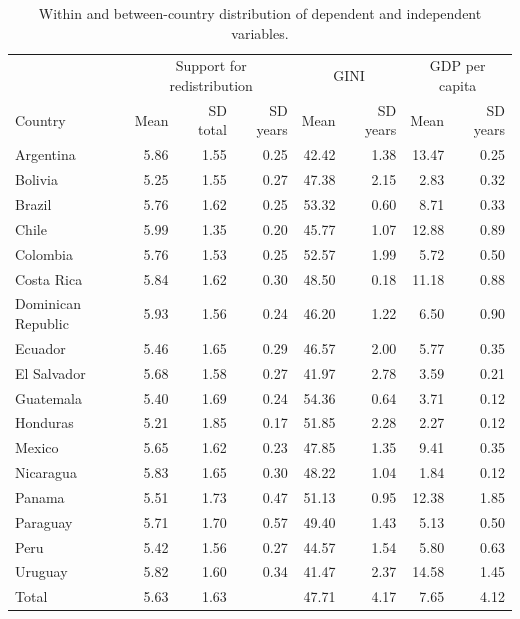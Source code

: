 \documentclass[utf8]{frontiers_suppmat} %
\begin{document}
\newpage


\begin{table}[h]
\centering
	\caption{Within and between-country distribution of dependent and independent variables.}
	\label{appendix2}
    \renewcommand{\arraystretch}{0.8}
\begin{tabular}{lrrrrrrr}
  \toprule
	 & \multicolumn{3}{c}{Support for redistribution} & \multicolumn{2}{c}{GINI} & \multicolumn{2}{c}{GDP per capita} \\
    Country & Mean & SD total & SD years & Mean & SD years & Mean & SD years \\
  \midrule
  Argentina & 5.86 & 1.55 & 0.25 & 42.42 & 1.38 & 13.47 & 0.25 \\ 
  Bolivia & 5.25 & 1.55 & 0.27 & 47.38 & 2.15 & 2.83 & 0.32 \\ 
  Brazil & 5.76 & 1.62 & 0.25 & 53.32 & 0.60 & 8.71 & 0.33 \\ 
  Chile & 5.99 & 1.35 & 0.20 & 45.77 & 1.07 & 12.88 & 0.89 \\ 
  Colombia & 5.76 & 1.53 & 0.25 & 52.57 & 1.99 & 5.72 & 0.50 \\ 
  Costa Rica & 5.84 & 1.62 & 0.30 & 48.50 & 0.18 & 11.18 & 0.88 \\ 
  Dominican Republic & 5.93 & 1.56 & 0.24 & 46.20 & 1.22 & 6.50 & 0.90 \\ 
  Ecuador & 5.46 & 1.65 & 0.29 & 46.57 & 2.00 & 5.77 & 0.35 \\ 
  El Salvador & 5.68 & 1.58 & 0.27 & 41.97 & 2.78 & 3.59 & 0.21 \\ 
  Guatemala & 5.40 & 1.69 & 0.24 & 54.36 & 0.64 & 3.71 & 0.12 \\ 
  Honduras & 5.21 & 1.85 & 0.17 & 51.85 & 2.28 & 2.27 & 0.12 \\ 
  Mexico & 5.65 & 1.62 & 0.23 & 47.85 & 1.35 & 9.41 & 0.35 \\ 
  Nicaragua & 5.83 & 1.65 & 0.30 & 48.22 & 1.04 & 1.84 & 0.12 \\ 
  Panama & 5.51 & 1.73 & 0.47 & 51.13 & 0.95 & 12.38 & 1.85 \\ 
  Paraguay & 5.71 & 1.70 & 0.57 & 49.40 & 1.43 & 5.13 & 0.50 \\ 
  Peru & 5.42 & 1.56 & 0.27 & 44.57 & 1.54 & 5.80 & 0.63 \\ 
  Uruguay & 5.82 & 1.60 & 0.34 & 41.47 & 2.37 & 14.58 & 1.45 \\ 
  Total & 5.63 & 1.63 &  & 47.71 & 4.17 & 7.65 & 4.12 \\ 
		\bottomrule
	\end{tabular}
\end{table}
\end{document}

